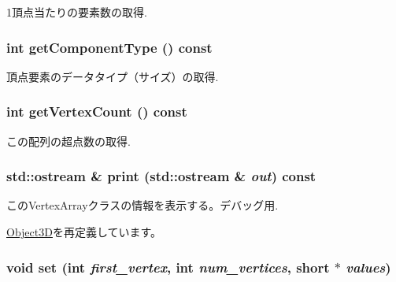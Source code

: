 1頂点当たりの要素数の取得. \hypertarget{classm3g_1_1VertexArray_9b7b78fbff0603779ec6bdd2a323c939}{
\subsubsection[{getComponentType}]{\setlength{\rightskip}{0pt plus 5cm}int getComponentType () const}}
\label{classm3g_1_1VertexArray_9b7b78fbff0603779ec6bdd2a323c939}


頂点要素のデータタイプ（サイズ）の取得. \hypertarget{classm3g_1_1VertexArray_c1c9b7f5b0dcd9c0310d7e77e10081ba}{
\subsubsection[{getVertexCount}]{\setlength{\rightskip}{0pt plus 5cm}int getVertexCount () const}}
\label{classm3g_1_1VertexArray_c1c9b7f5b0dcd9c0310d7e77e10081ba}


この配列の超点数の取得. \hypertarget{classm3g_1_1VertexArray_6fea17fa1532df3794f8cb39cb4f911f}{
\subsubsection[{print}]{\setlength{\rightskip}{0pt plus 5cm}std::ostream \& print (std::ostream \& {\em out}) const}}
\label{classm3g_1_1VertexArray_6fea17fa1532df3794f8cb39cb4f911f}


このVertexArrayクラスの情報を表示する。デバッグ用. 

\hyperlink{classm3g_1_1Object3D_6fea17fa1532df3794f8cb39cb4f911f}{Object3D}を再定義しています。\hypertarget{classm3g_1_1VertexArray_ac10afe01263d9ac5e7f972a7263de4a}{
\subsubsection[{set}]{\setlength{\rightskip}{0pt plus 5cm}void set (int {\em first\_\-vertex}, \/  int {\em num\_\-vertices}, \/  short $\ast$ {\em values})}}
\label{classm3g_1_1VertexArray_ac10afe01263d9ac5e7f972a7263de4a}


